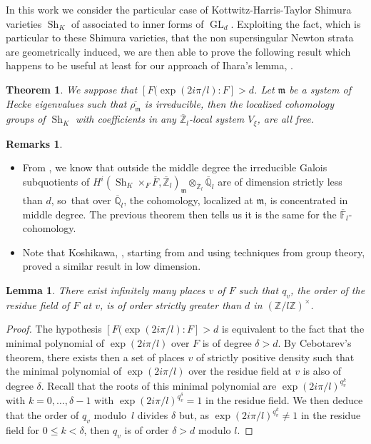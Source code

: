 \documentclass[JEP,XML,SOM,Unicode,published]{cedram}
\DeclareMathOperator{\GL}{GL}
\theoremstyle{plain}
\newtheorem*{thm*}{Theorem}
\newtheorem*{lem*}{Lemma}
\theoremstyle{definition}
\newtheorem*{remarks}{Remarks}
\numberwithin{equation}{subsection}
\newcommand\Fm{{\mathbb F}}
\newcommand\Qm{{\mathbb Q}}
\newcommand\Zm{{\mathbb Z}}
\DeclareMathOperator{\sh}{Sh}
\begin{document}
In this work we consider the particular case of Kottwitz-Harris-Taylor Shimura varieties $\sh_K$
of \cite{h-t} associated to inner forms of $\GL_d$. Exploiting the fact, which is particular to these Shimura
varieties, that the non supersingular Newton strata are geometrically induced, we are then able to
prove the following result which happens to be useful at least for our approach of
Ihara's lemma, \cf \cite{boyer-ihara}.

\begin{thm*}
We suppose that $[F(\exp(2i\pi/l):F]>d$.
Let $\mathfrak m$ be a system of Hecke eigenvalues
such that $\overline{\rho_{\mathfrak m}}$
is irreducible, then the localized cohomology groups of $\sh_K$ with coefficients in any
$\overline \Zm_l$-local system $V_\xi$, are all free.
\end{thm*}

\skpt
\begin{remarks}
\begin{itemize}
\item
From \cite[\S4]{boyer-compositio}, we know that outside
the middle degree the irreducible Galois subquotients of
$H^i(\sh_K \times_F \overline F,\overline \Zm_l)_{\mathfrak m} \otimes_{\overline \Zm_l} \overline \Qm_l$ are of dimension strictly less than $d$, so~that
over $\overline \Qm_l$, the cohomology, localized at $\mathfrak m$,
is concentrated in middle degree. The previous theorem then tells us
it is the same for the $\overline \Fm_l$-cohomology.

\item
Note that Koshikawa, \cf \cite{koshikawa}, starting from \cite{boyer-imj} and using techniques from group theory, proved a similar result in low dimension.
\end{itemize}
\end{remarks}

\begin{lem*}
There exist infinitely many places $v$ of $F$ such that $q_v$, the order of the residue field of $F$ at $v$,
is of order strictly greater than $d$ in $(\Zm/l\Zm)^\times$.
\end{lem*}

\begin{proof}
The hypothesis $[F(\exp(2i\pi/l):F]>d$ is equivalent to the fact that the minimal polynomial
of $\exp(2i\pi/l)$ over $F$ is of degree $\delta> d$. By Cebotarev's
theorem, there exists then a set of places $v$ of strictly positive density such that the minimal polynomial of $\exp(2i\pi/l)$ over the residue field at $v$
is also of degree $\delta$. Recall that the roots
of this minimal polynomial are $\exp(2i\pi/l)^{q_v^k}$ with $k=0,\dots,
\delta-1$ with $\exp(2i\pi/l)^{q_v^{\delta}} =1$ in the residue field.
We then deduce that the order of $q_v$ modulo~$l$ divides $\delta$ but,
as $\exp(2i\pi/l)^{q_v^k} \neq 1$ in the residue field for $0 \leq k < \delta$,
then $q_v$ is of order $\delta > d$ modulo $l$.
\end{proof}
\end{document}
